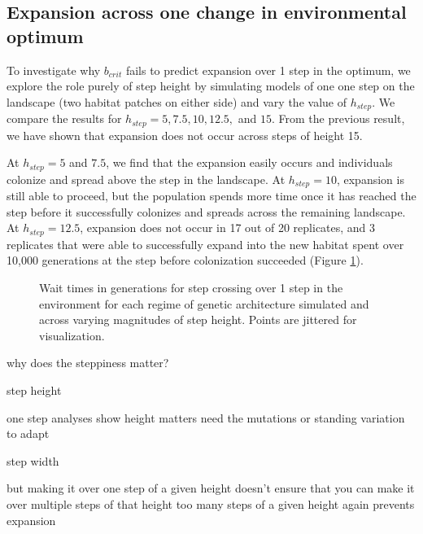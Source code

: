 
\subsection{Expansion across one change in environmental optimum}

To investigate why $b_{crit}$ fails to predict expansion over 1 step in the optimum, we explore the role purely of step height by simulating models of one one step on the landscape (two habitat patches on either side) and vary the value of $h_{step}$. We compare the results for $h_{step} = 5, 7.5, 10, 12.5,$ and $15$. From the previous result, we have shown that expansion does not occur across steps of height 15.

At $h_{step} = 5$ and $7.5$, we find that the expansion easily occurs and individuals colonize and spread above the step in the landscape. At $h_{step} = 10$, expansion is still able to proceed, but the population spends more time once it has reached the step before it successfully colonizes and spreads across the remaining landscape. At $h_{step} = 12.5$, expansion does not occur in 17 out of 20 replicates, and 3 replicates that were able to successfully expand into the new habitat spent over 10,000 generations at the step before colonization succeeded (Figure \ref{fig:waittimes}).





\begin{figure}[h]
\centering
{}
\caption[Wait times for step crossing.]{Wait times in generations for step crossing over 1 step in the environment for each regime of genetic architecture simulated and across varying magnitudes of step height. Points are jittered for visualization.}
\label{fig:waittimes}
\end{figure}


why does the steppiness matter?

step height

	one step analyses show height matters
	need the mutations or standing variation to adapt


step width

	but making it over one step of a given height doesn't ensure that you can make it over multiple steps of that height
	too many steps of a given height again prevents expansion
	
